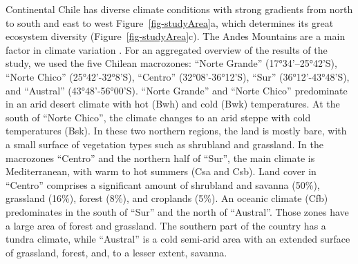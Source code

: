 \documentclass[
  authoryear,
  preprint,
  3p,
  onecolumn]{elsarticle}
\begin{document}
Continental Chile has diverse climate conditions with strong gradients
from north to south and east to west \citep{Aceituno2021}
Figure~\ref{fig-studyArea}a, which determines its great ecosystem
diversity \citep{Luebert2022} (Figure~\ref{fig-studyArea}c). The Andes
Mountains are a main factor in climate variation \citep{Garreaud2009}.
For an aggregated overview of the results of the study, we used the five
Chilean macrozones: ``Norte Grande'' (17°34'--25°42'S), ``Norte Chico''
(25°42'-32°8'S), ``Centro'' (32°08'-36°12'S), ``Sur'' (36°12'-43°48'S),
and ``Austral'' (43°48'-56°00'S). ``Norte Grande'' and ``Norte Chico''
predominate in an arid desert climate with hot (Bwh) and cold (Bwk)
temperatures. At the south of ``Norte Chico'', the climate changes to an
arid steppe with cold temperatures (Bsk). In these two northern regions,
the land is mostly bare, with a small surface of vegetation types such
as shrubland and grassland. In the macrozones ``Centro'' and the
northern half of ``Sur'', the main climate is Mediterranean, with warm
to hot summers (Csa and Csb). Land cover in ``Centro'' comprises a
significant amount of shrubland and savanna (50\%), grassland (16\%),
forest (8\%), and croplands (5\%). An oceanic climate (Cfb) predominates
in the south of ``Sur'' and the north of ``Austral''. Those zones have a
large area of forest and grassland. The southern part of the country has
a tundra climate, while ``Austral'' is a cold semi-arid area with an
extended surface of grassland, forest, and, to a lesser extent, savanna.
\end{document}
